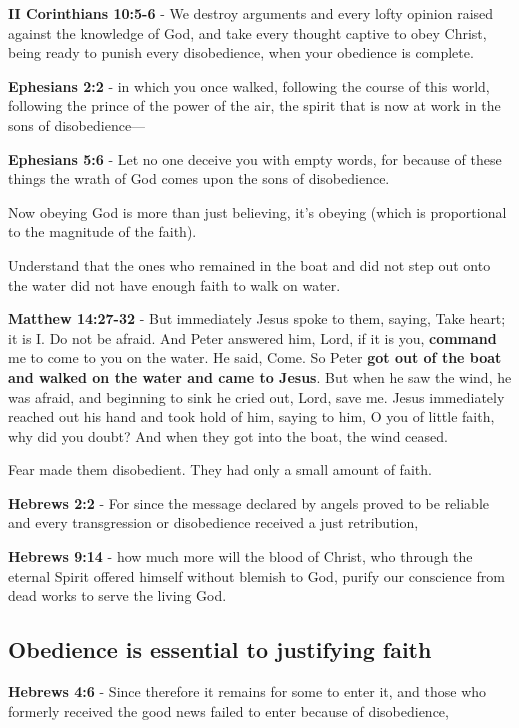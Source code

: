 \documentclass[11pt]{article}
\begin{document}
\textbf{II Corinthians 10:5-6} - We destroy arguments and every lofty opinion raised against the knowledge of God, and take every thought captive to obey Christ, being ready to punish every disobedience, when your obedience is complete.

\textbf{Ephesians 2:2} - in which you once walked, following the course of this world, following the prince of the power of the air, the spirit that is now at work in the sons of disobedience—

\textbf{Ephesians 5:6} - Let no one deceive you with empty words, for because of these things the wrath of God comes upon the sons of disobedience.

Now obeying God is more than just believing, it's obeying (which is proportional to the magnitude of the faith).

Understand that the ones who remained in the boat and did not step out onto the water did not have enough faith to walk on water.

\textbf{Matthew 14:27-32} - But immediately Jesus spoke to them, saying, Take heart; it is I. Do not be afraid. And Peter answered him, Lord, if it is you, \textbf{command} me to come to you on the water. He said, Come. So Peter \textbf{got out of the boat and walked on the water and came to Jesus}. But when he saw the wind, he was afraid, and beginning to sink he cried out, Lord, save me. Jesus immediately reached out his hand and took hold of him, saying to him, O you of little faith, why did you doubt? And when they got into the boat, the wind ceased.

Fear made them disobedient. They had only a small amount of faith.

\textbf{Hebrews 2:2} - For since the message declared by angels proved to be reliable and every transgression or disobedience received a just retribution,

\textbf{Hebrews 9:14} - how much more will the blood of Christ, who through the eternal Spirit offered himself without blemish to God, purify our conscience from dead works to serve the living God.

\subsection{Obedience is essential to justifying faith}
\label{sec:orgb6942ad}
\textbf{Hebrews 4:6} - Since therefore it remains for some to enter it, and those who formerly received the good news failed to enter because of disobedience,
\end{document}

